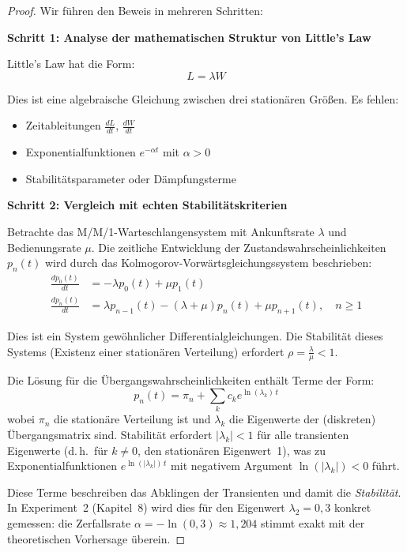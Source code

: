 ﻿\documentclass[a4paper,12pt]{scrreprt}
\theoremstyle{definition}
\begin{document}
\begin{proof}
	Wir führen den Beweis in mehreren Schritten:
	
	\textbf{Schritt 1: Analyse der mathematischen Struktur von Little's Law}
	
	Little's Law hat die Form:
	\begin{equation}
		L = \lambda W
	\end{equation}
	
	Dies ist eine algebraische Gleichung zwischen drei stationären Größen. Es fehlen:
	\begin{itemize}
		\item[-] Zeitableitungen $\frac{dL}{dt}$, $\frac{dW}{dt}$
		\item[-] Exponentialfunktionen $e^{-\alpha t}$ mit $\alpha > 0$
		\item[-] Stabilitätsparameter oder Dämpfungsterme
	\end{itemize}
	
	\textbf{Schritt 2: Vergleich mit echten Stabilitätskriterien}
	
	Betrachte das M/M/1-Warteschlangensystem mit Ankunftsrate $\lambda$ und Bedienungsrate $\mu$. Die zeitliche Entwicklung der Zustandswahrscheinlichkeiten $p_n(t)$ wird durch das Kolmogorov-Vorwärtsgleichungssystem beschrieben:
	\begin{align}
		\frac{dp_0(t)}{dt} &= -\lambda p_0(t) + \mu p_1(t) \\
		\frac{dp_n(t)}{dt} &= \lambda p_{n-1}(t) - (\lambda + \mu) p_n(t) + \mu p_{n+1}(t), \quad n \geq 1
	\end{align}
	
	Dies ist ein System gewöhnlicher Differentialgleichungen. Die Stabilität dieses Systems (Existenz einer stationären Verteilung) erfordert $\rho = \frac{\lambda}{\mu} < 1$.
	
	Die Lösung für die Übergangswahrscheinlichkeiten enthält Terme der Form:
	\begin{equation}
		p_n(t) = \pi_n + \sum_{k} c_k e^{\ln(\lambda_k)\,t}
	\end{equation}
	wobei $\pi_n$ die stationäre Verteilung ist und $\lambda_k$ die Eigenwerte
	der (diskreten) Übergangsmatrix sind.  Stabilität erfordert $|\lambda_k| < 1$
	für alle transienten Eigenwerte (d.\,h.\ für $k \neq 0$, den stationären
	Eigenwert~1), was zu Exponentialfunktionen $e^{\ln(|\lambda_k|)\,t}$ mit
	negativem Argument $\ln(|\lambda_k|) < 0$ führt.
	
	Diese Terme beschreiben das Abklingen der Transienten und damit
	die \textit{Stabilität}.  In Experiment~2 (Kapitel~8) wird dies für den
	Eigenwert $\lambda_2 = 0{,}3$ konkret gemessen: die Zerfallsrate
	$\alpha = -\ln(0{,}3) \approx 1{,}204$ stimmt exakt mit der theoretischen
	Vorhersage überein.
	

\end{proof}
\end{document}
